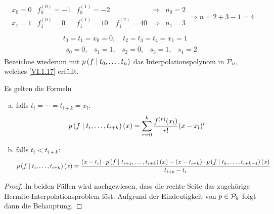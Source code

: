 \begin{Bspe}\label{6.1.13}
  \begin{align*}
    \begin{array}{ccccrc}
      x_0=0 & f_0^{(0)} = -1 & f_0^{(1)}= -2 
      && \Rightarrow & n_0=2 \\
      x_1=1 & f_1^{(0)} = 0 &  f_1^{(1)}= 10 & f_1^{(2)}=40               
                     &\Rightarrow & n_1=3 \\
    \end{array}\Longrightarrow n=2+3-1=4
  \end{align*}
  \begin{gather*}
    t_0 = t_1 =x_0=0, \quad t_2=t_3=t_4=x_1=1 \\
    \begin{array}{ccccc}
      s_0=0, & s_1=1, & s_2=0, & s_3=1, & s_4=2
    \end{array}
  \end{gather*}
  Bezeichne wiederum mit $p\left( f \mid t_0,\dotsc,t_n \right)$
  das Interpolationspolynom in $\mathcal{P}_n$,
  welches \eqref{VI.1.17} erfüllt.
\end{Bspe}

\begin{Leme}
  \label{6.1.14}
  Es gelten die Formeln
  \begin{enumerate}[a)]
  \item falls $t_i=\dotsb = t_{i+k}=x_l$:
    \begin{gather}
      p\left( f \mid t_i,\dotsc,t_{i+k} \right)(x) 
      = \sum_{r=0}^{k}\frac{f^{(r)}(x_l)}{r!}(x-x_l)^r
      \label{VI.1.19}
    \end{gather}
  \item falls $t_i<t_{i+k} $:
    \begin{gather}
      p\left( f \mid t_i,\dotsc,t_{i+k} \right)(x) 
      = \frac{(x-t_i)\cdot p\left( f \mid t_{i+1},\dotsc,t_{i+k} \right)(x)
        - (x-t_{i+k})\cdot p\left( f \mid t_k,\dotsc,t_{i+k-1} \right)(x)}
      {t_{i+k}-t_i}
      \label{VI.1.20}
    \end{gather}
  \end{enumerate}
\end{Leme}

\begin{proof}
  In beiden Fällen wird nachgewiesen, dass die rechte Seite
  das zugehörige Hermite-Interpolationsproblem löst.
  Aufgrund der Eindeutigkeit von $p\in\mathcal{P}_k$
  folgt dann die Behauptung.
\end{proof}


